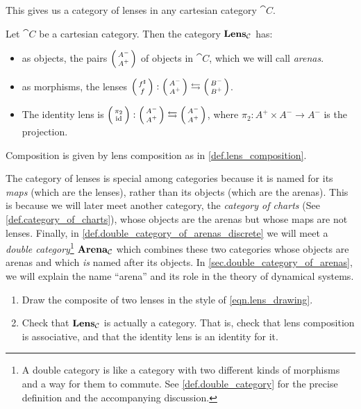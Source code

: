 \documentclass[DynamicalBook]{subfiles}
\begin{document}
This gives us a category of lenses in any cartesian category $\cat{C}$.

\begin{definition}\label{def.lens_category}
Let $\cat{C}$ be a cartesian category. Then the category $\textbf{Lens}_{\mathcal{C}}$
has:
\begin{itemize}
\item as objects, the pairs $\lens{A^-}{A^+}$ of objects in $\cat{C}$, which we will
  call \emph{arenas}.
\item as morphisms, the lenses $\lens{f^{\sharp}}{f} : \lens{A^-}{A^+} \leftrightarrows \lens{B^-}{B^+}$.
\item The identity lens is $\lens{\pi_2}{\id} : \lens{A^-}{A^+} \leftrightarrows
  \lens{A^-}{A^+}$, where $\pi_2 : A^+ \times A^- \to A^-$ is the projection.
\end{itemize}
\item Composition is given by lens composition as in \cref{def.lens_composition}.
\end{definition}

\begin{remark}
  The category of lenses is special among categories because it is named for its
  \emph{maps} (which are the lenses), rather than its objects (which are the
  arenas). This is because we will later meet another category, the
  \emph{category of charts} (See \cref{def.category_of_charts}), whose objects are
  the arenas but whose maps are not lenses. Finally, in
  \cref{def.double_category_of_arenas_discrete} we will meet a \emph{double
    category}\footnote{A double category is like a category with two different
    kinds of morphisms and a way for them to commute. See
    \cref{def.double_category} for the precise definition and the accompanying
    discussion.} $\textbf{Arena}_{\mathcal{C}}$ which combines these two categories whose objects
  are arenas and which \emph{is} named after its objects. In
  \cref{sec.double_category_of_arenas}, we will explain the name ``arena'' and
  its role in the theory of dynamical systems.
\end{remark}

\begin{exercise}
  \begin{enumerate}
  	\item Draw the composite of two lenses in the style of \eqref{eqn.lens_drawing}.
   	\item Check that $\textbf{Lens}_{\mathcal{C}}$ is actually a category. That is, check that
    lens composition is associative, and that the identity lens is an identity for it.
  \qedhere
  \end{enumerate}
\end{exercise}
\end{document}
